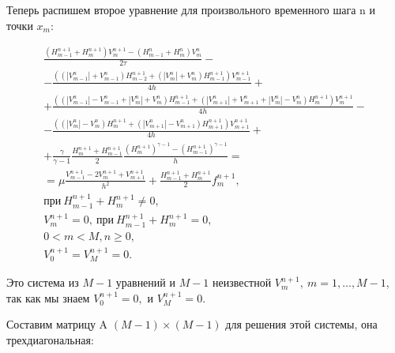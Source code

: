 \documentclass[12pt]{article}
\begin{document}
Теперь распишем второе уравнение для произвольного временного шага n и точки $x_m$:

\begin{equation}
\begin{gathered}
\frac{(H_{m-1}^{n+1} + H_m^{n+1}) V_m^{n+1} - (H_{m-1}^n + H_m^n)V_m^n}{2\tau}-\\
- \frac{((|V_{m-1}^n|+V_{m-1}^n)H_{m-2}^{n+1} + (|V_{m}^n| +V_m^n)H_{m-1}^{n+1})V_{m-1}^{n+1}}{4h} +\\
+ \frac {((|V_{m-1}^n| - V_{m-1}^n +|V_m^n| + V_m^n)H_{m-1}^{n+1} + (|V_{m+1}^n| + V_{m+1}^n + |V_m^n| - V_m^n)H_m^{n+1})V_m^{n+1}}{4h} -\\
- \frac {((|V_m^n| - V_m^n)H_m^{n+1} + (|V_{m+1}^n| - V_{m+1}^n)H_{m+1}^{n+1})V_{m+1}^{n+1}}{4h}+\\
+ \frac{\gamma}{\gamma - 1} \frac {H_m^{n+1} + H_{m-1}^{n+1}}{2} \frac {(H_m^{n+1})^{\gamma - 1} - (H_{m-1}^{n+1})^{\gamma - 1}}{h} = \\
= \mu \frac {V_{m-1}^{n+1} - 2 V_m^{n+1} + V_{m+1}^{n+1}}{h^2} + \frac {H_{m-1}^{n+1} + H_m^{n+1}}{2}f_m^{n+1},\\
\text{при}\ H_{m-1}^{n+1} + H_{m}^{n+1} \ne 0,\\
V_m^{n+1} = 0,\ \text{при}\ H_{m-1}^{n+1} + H_m^{n+1} = 0,\\
0 < m < M, n \ge 0,\\
V_0^{n+1} = V_M^{n+1} = 0.
\end{gathered}
\end{equation}

Это система из $M - 1$ уравнений и $M - 1$ неизвестной $V_m^{n+1},\ m = 1,\ldots,M-1$, так как мы знаем $V_0^{n+1} = 0, \text{ и } V_M^{n+1} = 0$.

Составим матрицу A $(M-1)\times (M-1)$ для решения этой системы, она трехдиагональная:
\end{document}
